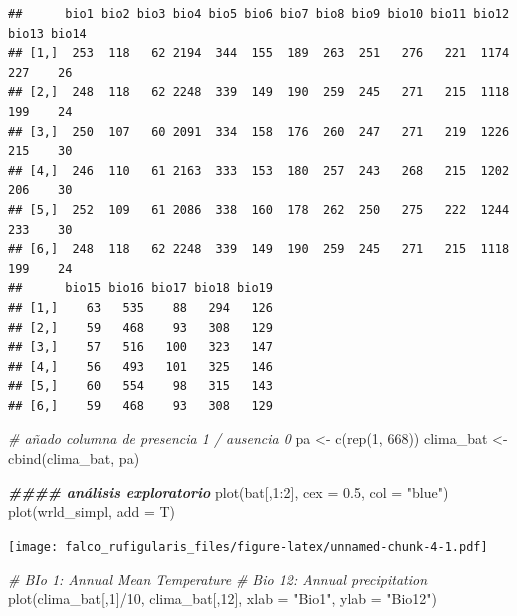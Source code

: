 \documentclass[
]{article}
\newenvironment{Shaded}{\begin{snugshade}}{\end{snugshade}}
\newcommand{\AttributeTok}[1]{\textcolor[rgb]{0.77,0.63,0.00}{#1}}
\newcommand{\CommentTok}[1]{\textcolor[rgb]{0.56,0.35,0.01}{\textit{#1}}}
\newcommand{\DecValTok}[1]{\textcolor[rgb]{0.00,0.00,0.81}{#1}}
\newcommand{\DocumentationTok}[1]{\textcolor[rgb]{0.56,0.35,0.01}{\textbf{\textit{#1}}}}
\newcommand{\FloatTok}[1]{\textcolor[rgb]{0.00,0.00,0.81}{#1}}
\newcommand{\FunctionTok}[1]{\textcolor[rgb]{0.00,0.00,0.00}{#1}}
\newcommand{\NormalTok}[1]{#1}
\newcommand{\OtherTok}[1]{\textcolor[rgb]{0.56,0.35,0.01}{#1}}
\newcommand{\SpecialCharTok}[1]{\textcolor[rgb]{0.00,0.00,0.00}{#1}}
\newcommand{\StringTok}[1]{\textcolor[rgb]{0.31,0.60,0.02}{#1}}
\begin{document}
\begin{verbatim}
##      bio1 bio2 bio3 bio4 bio5 bio6 bio7 bio8 bio9 bio10 bio11 bio12 bio13 bio14
## [1,]  253  118   62 2194  344  155  189  263  251   276   221  1174   227    26
## [2,]  248  118   62 2248  339  149  190  259  245   271   215  1118   199    24
## [3,]  250  107   60 2091  334  158  176  260  247   271   219  1226   215    30
## [4,]  246  110   61 2163  333  153  180  257  243   268   215  1202   206    30
## [5,]  252  109   61 2086  338  160  178  262  250   275   222  1244   233    30
## [6,]  248  118   62 2248  339  149  190  259  245   271   215  1118   199    24
##      bio15 bio16 bio17 bio18 bio19
## [1,]    63   535    88   294   126
## [2,]    59   468    93   308   129
## [3,]    57   516   100   323   147
## [4,]    56   493   101   325   146
## [5,]    60   554    98   315   143
## [6,]    59   468    93   308   129
\end{verbatim}

\begin{Shaded}
\begin{Highlighting}[]
\CommentTok{\# añado columna de presencia 1 / ausencia 0 }
\NormalTok{pa }\OtherTok{\textless{}{-}} \FunctionTok{c}\NormalTok{(}\FunctionTok{rep}\NormalTok{(}\DecValTok{1}\NormalTok{, }\DecValTok{668}\NormalTok{)) }
\NormalTok{clima\_bat }\OtherTok{\textless{}{-}} \FunctionTok{cbind}\NormalTok{(clima\_bat, pa)}

\DocumentationTok{\#\#\#\# análisis exploratorio }
\FunctionTok{plot}\NormalTok{(bat[,}\DecValTok{1}\SpecialCharTok{:}\DecValTok{2}\NormalTok{], }\AttributeTok{cex =} \FloatTok{0.5}\NormalTok{, }\AttributeTok{col =} \StringTok{"blue"}\NormalTok{)}
\FunctionTok{plot}\NormalTok{(wrld\_simpl, }\AttributeTok{add =}\NormalTok{ T)}
\end{Highlighting}
\end{Shaded}

\texttt{[image: falco\_rufigularis\_files/figure-latex/unnamed-chunk-4-1.pdf]}

\begin{Shaded}
\begin{Highlighting}[]
\CommentTok{\# BIo 1: Annual Mean Temperature }
\CommentTok{\# Bio 12: Annual precipitation }
\FunctionTok{plot}\NormalTok{(clima\_bat[,}\DecValTok{1}\NormalTok{]}\SpecialCharTok{/}\DecValTok{10}\NormalTok{, clima\_bat[,}\DecValTok{12}\NormalTok{], }\AttributeTok{xlab =} \StringTok{"Bio1"}\NormalTok{, }\AttributeTok{ylab =} \StringTok{"Bio12"}\NormalTok{)}
\end{Highlighting}
\end{Shaded}
\end{document}
